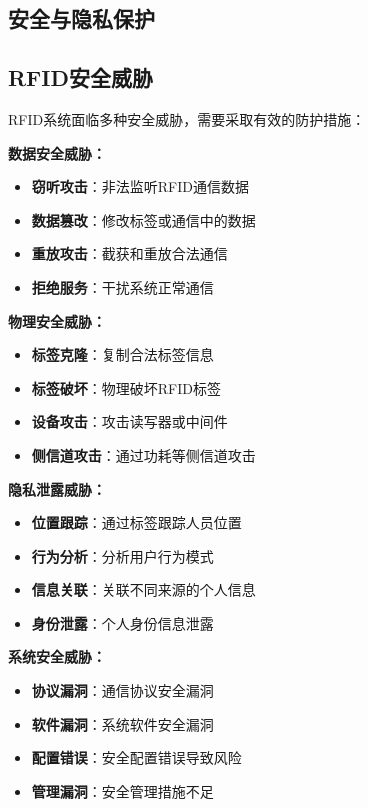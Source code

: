 \documentclass[12pt,UTF8]{ctexbook}
\begin{document}
\begin{itemize}[leftmargin=3.5em]
\begin{itemize}[leftmargin=3.5em]
\begin{itemize}[leftmargin=3.5em]
\begin{itemize}[leftmargin=3.5em]
\chapter{安全与隐私保护}

\section{RFID安全威胁}

RFID系统面临多种安全威胁，需要采取有效的防护措施：

\textbf{数据安全威胁：}
\begin{itemize}[leftmargin=3.5em]
    \item \textbf{窃听攻击}：非法监听RFID通信数据
    \item \textbf{数据篡改}：修改标签或通信中的数据
    \item \textbf{重放攻击}：截获和重放合法通信
    \item \textbf{拒绝服务}：干扰系统正常通信
\end{itemize}

\textbf{物理安全威胁：}
\begin{itemize}[leftmargin=3.5em]
    \item \textbf{标签克隆}：复制合法标签信息
    \item \textbf{标签破坏}：物理破坏RFID标签
    \item \textbf{设备攻击}：攻击读写器或中间件
    \item \textbf{侧信道攻击}：通过功耗等侧信道攻击
\end{itemize}

\textbf{隐私泄露威胁：}
\begin{itemize}[leftmargin=3.5em]
    \item \textbf{位置跟踪}：通过标签跟踪人员位置
    \item \textbf{行为分析}：分析用户行为模式
    \item \textbf{信息关联}：关联不同来源的个人信息
    \item \textbf{身份泄露}：个人身份信息泄露
\end{itemize}

\textbf{系统安全威胁：}
\begin{itemize}[leftmargin=3.5em]
    \item \textbf{协议漏洞}：通信协议安全漏洞
    \item \textbf{软件漏洞}：系统软件安全漏洞
    \item \textbf{配置错误}：安全配置错误导致风险
    \item \textbf{管理漏洞}：安全管理措施不足
\end{itemize}


\end{itemize}
\end{itemize}
\end{itemize}
\end{itemize}
\end{document}
